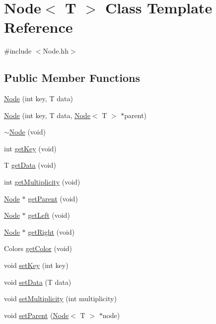 \hypertarget{class_node}{}\section{Node$<$ T $>$ Class Template Reference}
\label{class_node}


{\ttfamily \#include $<$Node.\+hh$>$}

\subsection*{Public Member Functions}
\begin{DoxyCompactItemize}
\item 
\hyperlink{class_node_a40d6e9db35a69683afc2a960f96c1109}{Node} (int key, T data)
\item 
\hyperlink{class_node_a2e3be75932d110fb2a52a3c297159f75}{Node} (int key, T data, \hyperlink{class_node}{Node}$<$ T $>$ $\ast$parent)
\item 
\hyperlink{class_node_a5fc413278a0bd22eb84e03c0ae90e22a}{$\sim$\+Node} (void)
\item 
int \hyperlink{class_node_a5ff3a3dd66edef87867616d1bc44838f}{get\+Key} (void)
\item 
T \hyperlink{class_node_ad89031c2899fe91646652ce4c2e79ab6}{get\+Data} (void)
\item 
int \hyperlink{class_node_ab83eb1cc81f91a5641693eb22712f8c8}{get\+Multiplicity} (void)
\item 
\hyperlink{class_node}{Node} $\ast$ \hyperlink{class_node_ad6543650b2b521ced0456014d0344e3c}{get\+Parent} (void)
\item 
\hyperlink{class_node}{Node} $\ast$ \hyperlink{class_node_a2ab0ff5c5d882b57577c077ee897397e}{get\+Left} (void)
\item 
\hyperlink{class_node}{Node} $\ast$ \hyperlink{class_node_a19f6f466f04ca1dc6a314b25c3d13c99}{get\+Right} (void)
\item 
Colors \hyperlink{class_node_a9c209bbcd6a8c1e07914a0c6bea3a6f4}{get\+Color} (void)
\item 
void \hyperlink{class_node_a1fd640805e263fe8c792c901467580c7}{set\+Key} (int key)
\item 
void \hyperlink{class_node_a3955130f36c0a6d39641dee186caf2a3}{set\+Data} (T data)
\item 
void \hyperlink{class_node_a496d3786e0f7939676f30e2cead4ca29}{set\+Multiplicity} (int multiplicity)
\item 
void \hyperlink{class_node_a78162c98233ea6c275412a9ff0571260}{set\+Parent} (\hyperlink{class_node}{Node}$<$ T $>$ $\ast$node)

\end{DoxyCompactItemize}
